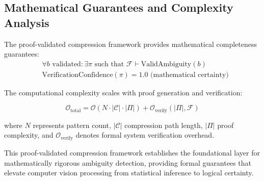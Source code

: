 \subsection{Mathematical Guarantees and Complexity Analysis}

\begin{theorem}
The proof-validated compression framework provides mathematical completeness guarantees:
\begin{align}
&\forall b \text{ validated}: \exists \pi \text{ such that } \mathcal{F} \vdash \text{ValidAmbiguity}(b) \label{eq:completeness}\\
&\text{VerificationConfidence}(\pi) = 1.0 \text{ (mathematical certainty)} \label{eq:certainty}
\end{align}
\end{theorem}

The computational complexity scales with proof generation and verification:

\begin{equation}
\mathcal{O}_{\text{total}} = \mathcal{O}(N \cdot |\mathcal{C}| \cdot |\Pi|) + \mathcal{O}_{\text{verify}}(|\Pi|, \mathcal{F})
\label{eq:computational-complexity}
\end{equation}

where $N$ represents pattern count, $|\mathcal{C}|$ compression path length, $|\Pi|$ proof complexity, and $\mathcal{O}_{\text{verify}}$ denotes formal system verification overhead.

This proof-validated compression framework establishes the foundational layer for mathematically rigorous ambiguity detection, providing formal guarantees that elevate computer vision processing from statistical inference to logical certainty.


